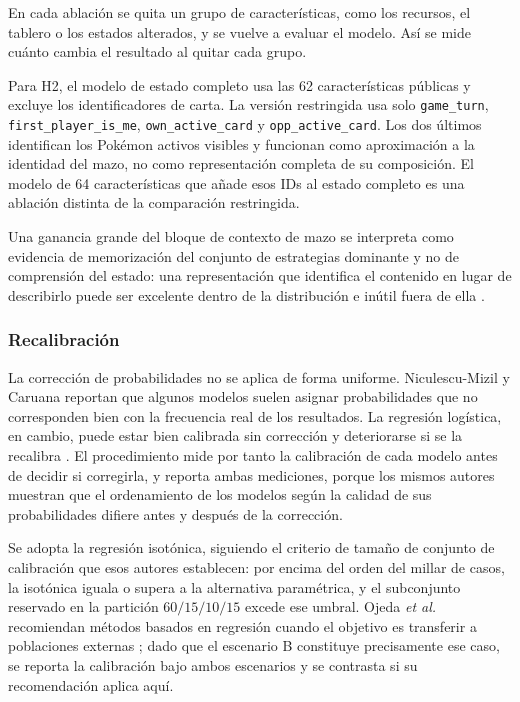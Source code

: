 En cada ablación se quita un grupo de características, como los recursos, el
tablero o los estados alterados, y se vuelve a evaluar el modelo. Así se mide
cuánto cambia el resultado al quitar cada grupo.

Para H2, el modelo de estado completo usa las 62 características públicas y
excluye los identificadores de carta. La versión restringida usa solo
\texttt{game\_turn}, \texttt{first\_player\_is\_me},
\texttt{own\_active\_card} y \texttt{opp\_active\_card}. Los dos últimos
identifican los Pok\'emon activos visibles y funcionan como aproximación a la
identidad del mazo, no como representación completa de su composición. El
modelo de 64 características que añade esos IDs al estado completo es una
ablación distinta de la comparación restringida.

Una ganancia grande del bloque de contexto de mazo se interpreta como
evidencia de memorización del conjunto de estrategias dominante y no de
comprensión del estado: una representación que identifica el contenido en
lugar de describirlo puede ser excelente dentro de la distribución e inútil
fuera de ella \cite{bertram_cardrepresentations_2024}.

\subsubsection{Recalibración}
\label{subsec:recalibracion}

La corrección de probabilidades no se aplica de forma uniforme.
Niculescu-Mizil y Caruana reportan que algunos modelos suelen asignar
probabilidades que no corresponden bien con la frecuencia real de los
resultados. La regresión logística, en cambio, puede estar bien calibrada
sin corrección y deteriorarse si se la recalibra
\cite{niculescumizil_probabilities_2005}. El procedimiento mide por tanto la
calibración de cada modelo antes de decidir si corregirla, y reporta ambas
mediciones, porque los mismos autores muestran que el ordenamiento de los
modelos según la calidad de sus probabilidades difiere antes y después de la
corrección.

Se adopta la regresión isotónica, siguiendo el criterio de tamaño de conjunto
de calibración que esos autores establecen: por encima del orden del millar
de casos, la isotónica iguala o supera a la alternativa paramétrica, y el
subconjunto reservado en la partición $60/15/10/15$ excede ese
umbral. Ojeda \textit{et al.} recomiendan métodos basados en regresión
cuando el objetivo es transferir a poblaciones externas
\cite{ojeda_calibrating_2023}; dado que el escenario B constituye
precisamente ese caso, se reporta la calibración bajo ambos escenarios y se
contrasta si su recomendación aplica aquí.

